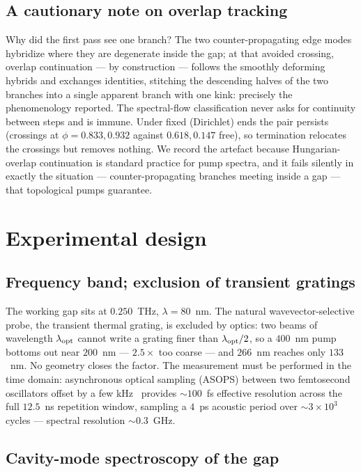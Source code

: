 \documentclass[aps,prl,preprint,superscriptaddress,longbibliography]{revtex4-2}
\begin{document}
\subsection{A cautionary note on overlap tracking}

Why did the first pass see one branch? The two counter-propagating edge
modes hybridize where they are degenerate inside the gap; at that avoided
crossing, overlap continuation --- by construction --- follows the smoothly
deforming hybrids and exchanges identities, stitching the descending halves
of the two branches into a single apparent branch with one kink: precisely
the phenomenology reported. The spectral-flow classification never asks for
continuity between steps and is immune. Under fixed (Dirichlet) ends the
pair persists (crossings at $\phi = 0.833, 0.932$ against $0.618, 0.147$
free), so termination relocates the crossings but removes nothing. We record
the artefact because Hungarian-overlap continuation is standard practice for
pump spectra, and it fails silently in exactly the situation ---
counter-propagating branches meeting inside a gap --- that topological pumps
guarantee.

\section{Experimental design}
\label{sec:expt}

\subsection{Frequency band; exclusion of transient gratings}

The working gap sits at $0.250$~THz, $\lambda = 80$~nm. The natural
wavevector-selective probe, the transient thermal grating, is excluded by
optics: two beams of wavelength $\lambda_{\rm opt}$ cannot write a grating
finer than $\lambda_{\rm opt}/2$, so a $400$~nm pump bottoms out near
$200$~nm --- $2.5\times$ too coarse --- and $266$~nm reaches only $133$~nm.
No geometry closes the factor. The measurement must be performed in the time
domain: asynchronous optical sampling (ASOPS) between two femtosecond
oscillators offset by a few kHz~\cite{bartels2007} provides
$\sim\!100$~fs effective resolution across the full $12.5$~ns repetition
window, sampling a $4$~ps acoustic period over $\sim\!3\times10^3$ cycles
--- spectral resolution $\sim\!0.3$~GHz.

\subsection{Cavity-mode spectroscopy of the gap}
\end{document}
